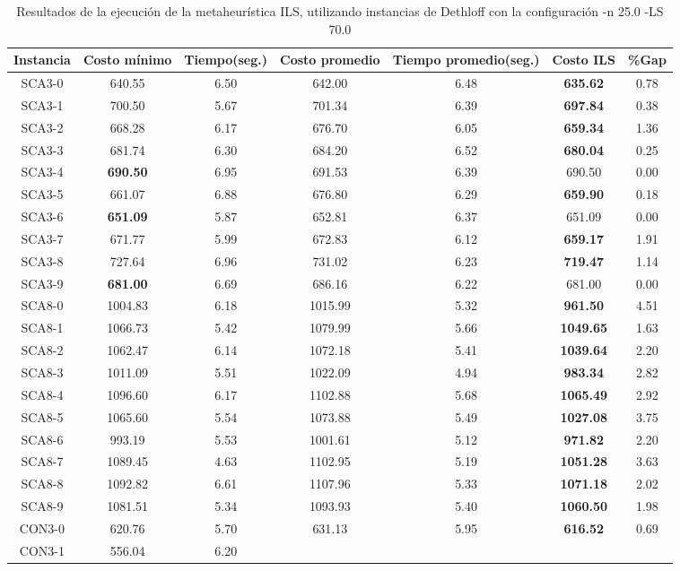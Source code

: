 \begin{table}[ht]
\caption{Resultados de la ejecución de la metaheurística ILS, utilizando instancias de Dethloff con la configuración -n 25.0 -LS 70.0}
\centering
\small
\begin{tabular}{c c c c c c c}
\hline\hline
Instancia & Costo mínimo & Tiempo(seg.) & Costo promedio & Tiempo promedio(seg.) & Costo ILS & \%Gap \\ [0.5ex]
\hline
SCA3-0 & 640.55 & 6.50 & 
642.00 & 6.48 & \bf{635.62} & 
0.78\\SCA3-1 & 700.50 & 5.67 & 
701.34 & 6.39 & \bf{697.84} & 
0.38\\SCA3-2 & 668.28 & 6.17 & 
676.70 & 6.05 & \bf{659.34} & 
1.36\\SCA3-3 & 681.74 & 6.30 & 
684.20 & 6.52 & \bf{680.04} & 
0.25\\SCA3-4 & \bf{690.50} & 6.95 & 
691.53 & 6.39 & 690.50 & 0.00\\
SCA3-5 & 661.07 & 6.88 & 
676.80 & 6.29 & \bf{659.90} & 
0.18\\SCA3-6 & \bf{651.09} & 5.87 & 
652.81 & 6.37 & 651.09 & 0.00\\
SCA3-7 & 671.77 & 5.99 & 
672.83 & 6.12 & \bf{659.17} & 
1.91\\SCA3-8 & 727.64 & 6.96 & 
731.02 & 6.23 & \bf{719.47} & 
1.14\\SCA3-9 & \bf{681.00} & 6.69 & 
686.16 & 6.22 & 681.00 & 0.00\\
SCA8-0 & 1004.83 & 6.18 & 
1015.99 & 5.32 & \bf{961.50} & 
4.51\\SCA8-1 & 1066.73 & 5.42 & 
1079.99 & 5.66 & \bf{1049.65} & 
1.63\\SCA8-2 & 1062.47 & 6.14 & 
1072.18 & 5.41 & \bf{1039.64} & 
2.20\\SCA8-3 & 1011.09 & 5.51 & 
1022.09 & 4.94 & \bf{983.34} & 
2.82\\SCA8-4 & 1096.60 & 6.17 & 
1102.88 & 5.68 & \bf{1065.49} & 
2.92\\SCA8-5 & 1065.60 & 5.54 & 
1073.88 & 5.49 & \bf{1027.08} & 
3.75\\SCA8-6 & 993.19 & 5.53 & 
1001.61 & 5.12 & \bf{971.82} & 
2.20\\SCA8-7 & 1089.45 & 4.63 & 
1102.95 & 5.19 & \bf{1051.28} & 
3.63\\SCA8-8 & 1092.82 & 6.61 & 
1107.96 & 5.33 & \bf{1071.18} & 
2.02\\SCA8-9 & 1081.51 & 5.34 & 
1093.93 & 5.40 & \bf{1060.50} & 
1.98\\CON3-0 & 620.76 & 5.70 & 
631.13 & 5.95 & \bf{616.52} & 
0.69\\CON3-1 & 556.04 & 6.20 & 

\end{tabular}
\end{table}
